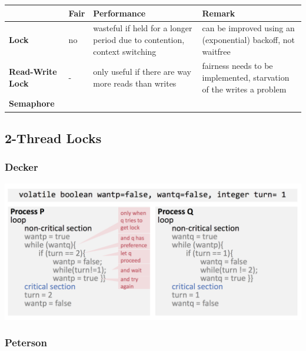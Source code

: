 \documentclass[11pt]{article}
\begin{document}
\begin{table}[H]
\centering

\begin{tabular}{|p{2cm}|p{1cm}|p{5cm}|p{4cm}|}
\hline
                   & \textbf{Fair} & \textbf{Performance}                                                      & \textbf{Remark}                                \\ \hline
\textbf{Lock}      & no            & wasteful if held for a longer period due to contention, context switching & can be improved using an (exponential) backoff, not waitfree \\ \hline
\textbf{Read-Write Lock}      & -            & only useful if there are way more reads than writes & fairness needs to be implemented, starvation of the writes a problem \\ \hline
\textbf{Semaphore} &               &                                                                           &     \\ \hline                                           
\end{tabular}
\end{table}

\subsection{2-Thread Locks}

\subsubsection{Decker}

\begin{center}
	\includegraphics[width=400pt]{images/decker}
\end{center}

\subsubsection{Peterson}
\end{document}
